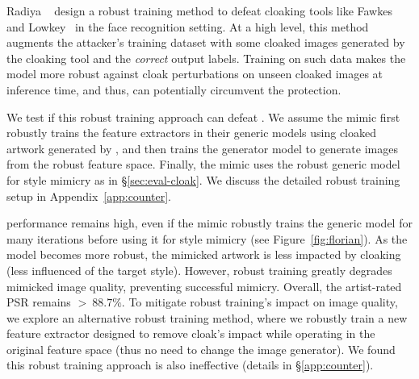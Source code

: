  Radiya
\etal~\cite{radiya2021data} design a robust training method to defeat
cloaking tools like Fawkes~\cite{shan2020fawkes} and
Lowkey~\cite{cherepanova2021lowkey} in the face recognition setting. At a
high level, this method augments the attacker's training dataset with some
cloaked images generated by the cloaking tool and the \textit{correct} output
labels. Training on such data makes the model more robust against cloak
perturbations on unseen cloaked images at inference time, and thus, can
potentially circumvent the protection.


We test if this robust training approach can defeat \system{}. We assume the
mimic first robustly trains the feature extractors in their generic models
using cloaked artwork generated by \system{}, and then trains the generator
model to generate images from the robust feature space. Finally, the mimic
uses the robust generic model for style mimicry as in
\S\ref{sec:eval-cloak}. We discuss the detailed robust training setup in
Appendix~\ref{app:counter}.  

\system{} performance remains high, even if the mimic robustly trains the
generic model for many iterations before using it for style mimicry (see
Figure~\ref{fig:florian}). As the model becomes more robust, the mimicked
artwork is less impacted by cloaking (less influenced of the target
style). However, robust training greatly degrades mimicked image quality,
preventing successful mimicry. Overall, the artist-rated PSR remains
$>~88.7\%$. To mitigate robust training's impact on image quality, we explore
an alternative robust training method, where we robustly train a new feature
extractor designed to remove cloak's impact while operating in the
original feature space (thus no need to change the image
generator). We found this robust training approach is also ineffective
(details in \S\ref{app:counter}).

